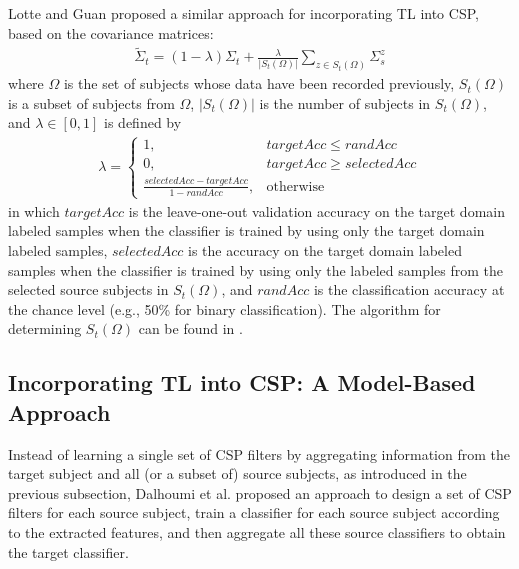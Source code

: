 \documentclass[runningheads]{llncs}
\begin{document}
Lotte and Guan \cite{Lotte2010} proposed a similar approach for incorporating TL into CSP, based on the covariance matrices:
\begin{align}
\widetilde{\Sigma}_t=(1-\lambda)\Sigma_t+\frac{\lambda}{|S_t(\Omega)|}
\sum_{z\in S_t(\Omega)}\Sigma_s^z \label{eq:Lotte}
\end{align}
where $\Omega$ is the set of subjects whose data have been recorded previously, $S_t(\Omega)$ is a subset of subjects from $\Omega$, $|S_t(\Omega)|$ is the number of subjects in $S_t(\Omega)$, and $\lambda\in[0,1]$ is defined by
\begin{align}
   \lambda=\begin{cases}
   1,&{targetAcc\leq randAcc}\\
    0,&{targetAcc\geq selectedAcc}\\
    \frac{selectedAcc-targetAcc}{1-randAcc},&\mbox{otherwise} \label{eq:lambda}
    \end{cases}
\end{align}
in which $targetAcc$ is the leave-one-out validation accuracy on the target domain labeled samples when the classifier is trained by using only the target domain labeled samples, $selectedAcc$ is the accuracy on the target domain labeled samples when the classifier is trained by using only the labeled samples from the selected source subjects in $S_t(\Omega)$, and $randAcc$ is the classification accuracy at the chance level (e.g., 50\% for binary classification). The algorithm for determining $S_t(\Omega)$ can be found in \cite{Lotte2010}.

\subsection{Incorporating TL into CSP: A Model-Based Approach} \label{sect:MA}

Instead of learning a single set of CSP filters by aggregating information from the target subject and all (or a subset of) source subjects, as introduced in the previous subsection, Dalhoumi et al. \cite{Dalhoumi2014} proposed an approach to design a set of CSP filters for each source subject, train a classifier for each source subject according to the extracted features, and then aggregate all these source classifiers to obtain the target classifier.
\end{document}
